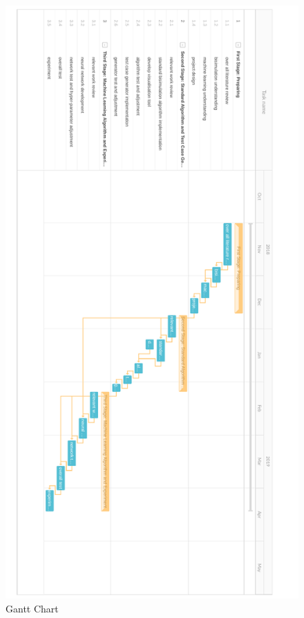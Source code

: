 \begin{figure}[hp]
    \centering
    \includegraphics[height=\textheight]{img/gantt.pdf}
    \caption{Gantt Chart}
    \label{fig:ganttchart}
\end{figure}






